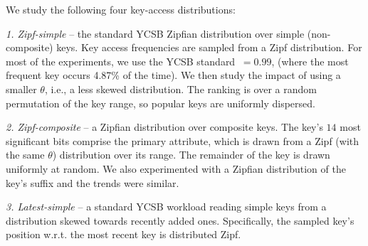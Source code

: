 \noindent
We study the following four key-access distributions:  

\emph{1. Zipf-simple} -- the standard YCSB Zipfian distribution over simple (non-composite) keys. 
Key access frequencies are sampled from a Zipf distribution. 
For most of the experiments, we use the YCSB standard $\ = 0.99$,
(where the most frequent key occurs 4.87\% of the time).
We then study the impact of using a smaller $\theta$, i.e., a less skewed distribution.
The ranking is over a random permutation of the key range, so popular keys are uniformly dispersed. %

\emph{2. Zipf-composite} -- a Zipfian distribution over composite keys.
The key's $14$ most significant bits comprise the primary attribute, which  
is drawn from a Zipf (with the same $\theta$) distribution over its range. The remainder of the key is drawn uniformly at random.
We also experimented with a Zipfian distribution of the key's suffix and 
the trends were similar. %

\emph{3. Latest-simple} -- a standard YCSB workload reading simple keys from a distribution skewed towards recently added ones. 
Specifically, the sampled key's position w.r.t. the most recent key is distributed Zipf. 


